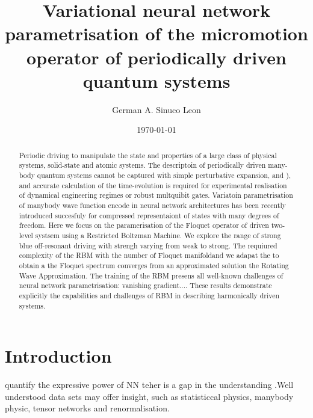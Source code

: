 \documentclass[pra,twocolumn,showkeys,preprintnumbers, amsmath,amssymb, aps,A4paper]{revtex4-1}
\begin{document}
\title{Variational neural network parametrisation of the micromotion operator of periodically driven quantum systems}

\author{German A. Sinuco Leon}


\date{\today}
\begin{abstract}
Periodic driving to manipulate the state and properties of a large class of physical systems, solid-state and atomic systems. The descriptoin of periodically driven many-body quantum systems cannot be captured with simple perturbative expansion, and ), and accurate calculation of the time-evolution is required for experimental realisation of dynamical engineering regimes  or robust multquibit gates. Variatoin parametrisation of manybody wave function encode in neural network architectures has been recently introduced succesfuly for compressed representaiont of states with many degrees of freedom. Here we focus on the paramerisation of the Floquet operator of driven two-level systsem using a Restricted Boltzman Machine. We explore the range of strong blue off-resonant driving with strengh varying from weak to strong. The requiured complexity of the RBM with the number of Floquet manifoldand we adapat the to obtain a the Floquet spectrum converges from an approximated solution the Rotating Wave Approximation. The training of the RBM presens all well-known challenges of neural network parametrisation: vanishing gradient.... These results demonstrate explicitly the capabilities and challenges of RBM in describing harmonically driven systems.
\end{abstract}

 
\maketitle


\section{\label{sec:Introduction} Introduction}



quantify the expressive power of NN teher is a gap in the understanding .Well understood data sets may offer insight, such as statisticcal physics, manybody physic, tensor networks and renormalisation.
\end{document}
